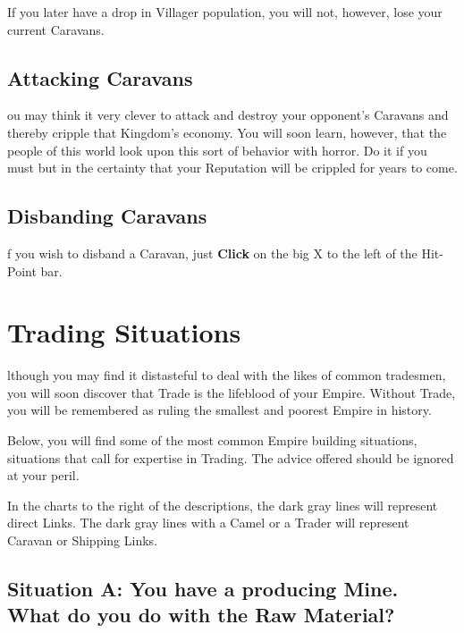 If you later have a drop in Villager population, you will not, however, lose your current Caravans.

\subsection{\textsf{Attacking Caravans}}


ou may think it very clever to attack and destroy your opponent’s Caravans and thereby cripple that Kingdom's economy. You will soon learn, however, that the people of this world look upon this sort of behavior with horror. Do it if you must but in the certainty that your Reputation will be crippled for years to come.

\subsection{\textsf{Disbanding Caravans}}


f you wish to disband a Caravan, just \textbf{Click} on the big X to the left of the Hit-Point bar.

\section{\textsf{Trading Situations}}


lthough you may find it distasteful to deal with the likes of common tradesmen, you will soon discover that Trade is the lifeblood of your Empire. Without Trade, you will be remembered as ruling the smallest and poorest Empire in history.

Below, you will find some of the most common Empire building situations, situations that call for expertise in Trading. The advice offered should be ignored at your peril.

In the charts to the right of the descriptions, the dark gray lines will represent direct Links. The dark gray lines with a Camel or a Trader will represent Caravan or Shipping Links.

\subsection{\textsf{Situation A: You have a producing Mine. What do you do with the Raw Material?}}

